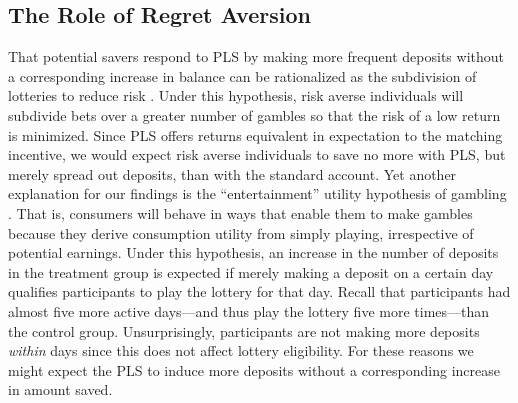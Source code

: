 \documentclass[12pt]{article}
\begin{document}


	\subsection{The Role of Regret Aversion} \label{sec:mechanisms}

		That potential savers respond to PLS by making more frequent deposits without a corresponding increase in balance can be rationalized as the subdivision of lotteries to reduce risk \parencite{samuelson_risk_1963}. Under this hypothesis, risk averse individuals will subdivide bets over a greater number of gambles so that the risk of a low return is minimized. Since PLS offers returns equivalent in expectation to the matching incentive, we would expect risk averse individuals to save no more with PLS, but merely spread out deposits, than with the standard account. Yet another explanation for our findings is the ``entertainment'' utility hypothesis of gambling \parencite{conlisk_utility_1993}. That is, consumers will behave in ways that enable them to make gambles because they derive consumption utility from simply playing, irrespective of potential earnings. Under this hypothesis, an increase in the number of deposits in the treatment group is expected if merely making a deposit on a certain day qualifies participants to play the lottery for that day. Recall that participants had almost five more active days---and thus play the lottery five more times---than the control group. Unsurprisingly, participants are not making more deposits \emph{within} days since this does not affect lottery eligibility. For these reasons we might expect the PLS to induce more deposits without a corresponding increase in amount saved.
\end{document}
